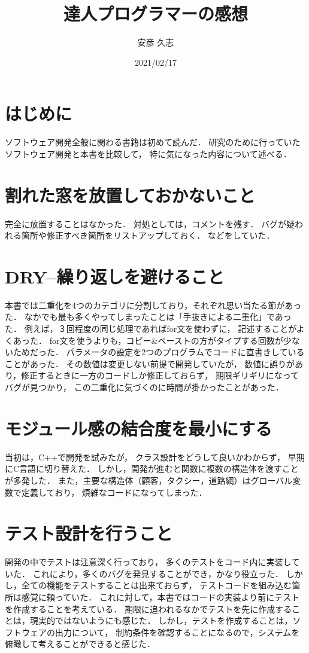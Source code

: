 \documentclass[oneside,a4paper,twocolumn,platex,dvipdfmx]{jarticle}
\title{達人プログラマーの感想}
\date{2021/02/17}
\author{安彦 久志}
\begin{document}
\maketitle
\thispagestyle{empty}
\section{はじめに}
ソフトウェア開発全般に関わる書籍は初めて読んだ．
研究のために行っていたソフトウェア開発と本書を比較して，
特に気になった内容について述べる．
\section{割れた窓を放置しておかないこと}
完全に放置することはなかった．
対処としては，コメントを残す．
バグが疑われる箇所や修正すべき箇所をリストアップしておく．
などをしていた．
\section{DRY--繰り返しを避けること}
本書では二重化を4つのカテゴリに分割しており，それぞれ思い当たる節があった．
なかでも最も多くやってしまったことは「手抜きによる二重化」であった．
例えば，３回程度の同じ処理であればfor文を使わずに，
記述することがよくあった．
for文を使うよりも，コピー\&ペーストの方がタイプする回数が少ないためだった．
パラメータの設定を2つのプログラムでコードに直書きしていることがあった．
その数値は変更しない前提で開発していたが，
数値に誤りがあり，修正するときに一方のコードしか修正しておらず，
期限ギリギリになってバグが見つかり，
この二重化に気づくのに時間が掛かったことがあった．
\section{モジュール感の結合度を最小にする}
当初は，C++で開発を試みたが，
クラス設計をどうして良いかわからず，
早期にC言語に切り替えた．
しかし，開発が進むと関数に複数の構造体を渡すことが多発した．
また，主要な構造体（顧客，タクシー，道路網）はグローバル変数で定義しており，
煩雑なコードになってしまった．
\section{テスト設計を行うこと}
開発の中でテストは注意深く行っており，
多くのテストをコード内に実装していた．
これにより，多くのバグを発見することができ，かなり役立った．
しかし，全ての機能をテストすることは出来ておらず，
テストコードを組み込む箇所は感覚に頼っていた．
これに対して，本書ではコードの実装より前にテストを作成することを考えている．
期限に追われるなかでテストを先に作成することは，現実的ではないようにも感じた．
しかし，テストを作成することは，ソフトウェアの出力について，
制約条件を確認することになるので，システムを俯瞰して考えることができると感じた．
\end{document}
